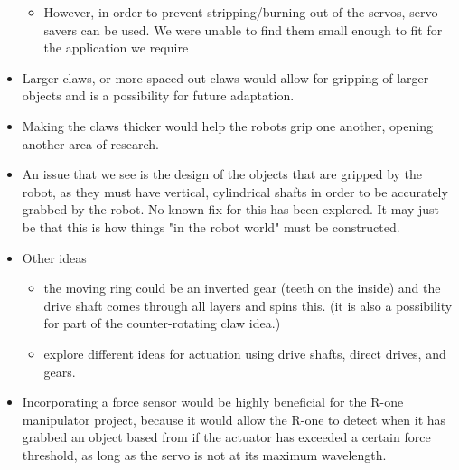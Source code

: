 \begin{itemize}
\begin{itemize}
\item However, in order to prevent stripping/burning out of the servos, servo savers can be used. We were unable to find them small enough to fit for the application we require
\end{itemize}
\item Larger claws, or more spaced out claws would allow for gripping of larger objects and is a possibility for future adaptation. 
\item Making the claws thicker would help the robots grip one another, opening another area of research. 
\item An issue that we see is the design of the objects that are gripped by the robot, as they must have vertical, cylindrical shafts in order to be accurately grabbed by the robot. No known fix for this has been explored. It may just be that this is how things "in the robot world" must be constructed. 
\item Other ideas
\begin{itemize}
\item the moving ring could be an inverted gear (teeth on the inside) and the drive shaft comes through all layers and spins this. (it is also a possibility for part of the counter-rotating claw idea.)
\item explore different ideas for actuation using drive shafts, direct drives, and gears.
\end{itemize}
\item Incorporating a force sensor would be highly beneficial for the R-one manipulator project, because it would allow the R-one to detect when it has grabbed an object based from if the actuator has exceeded a certain force threshold, as long as the servo is not at its maximum wavelength. 
\end{itemize}